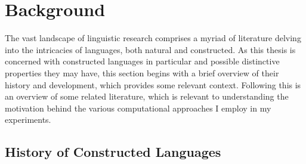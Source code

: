 \documentclass[12pt,a4paper]{article}
\numberwithin{figure}{section}
\numberwithin{table}{section}
\numberwithin{definition}{section}
\begin{document}
\newpage
\section{Background}
\label{sec:background}

The vast landscape of linguistic research comprises a myriad of literature delving into the intricacies of languages, both natural and constructed. As this thesis is concerned with constructed languages in particular and possible distinctive properties they may have, this section begins with a brief overview of their history and development, which provides some relevant context. Following this is an overview of some related literature, which is relevant to understanding the motivation behind the various computational approaches I employ in my experiments. 

\subsection{History of Constructed Languages}
\label{ssec:historyofconlangs}
\end{document}

